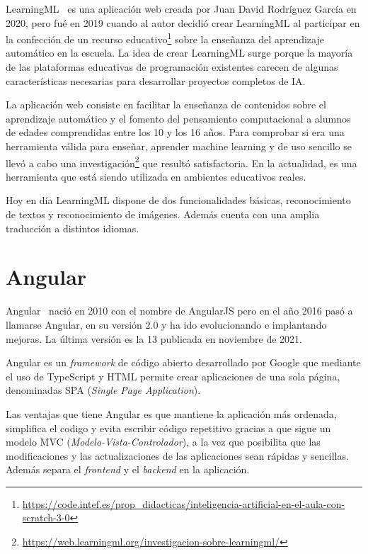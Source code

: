 \documentclass[a4paper, 12pt]{book}
\begin{document}
LearningML~\cite{Pagina_de_LearningML} es una aplicación web creada por Juan David Rodríguez García en 2020, pero fué en 2019 cuando al autor decidió crear LearningML al participar en la confección de un recurso educativo\footnote{\url{https://code.intef.es/prop_didacticas/inteligencia-artificial-en-el-aula-con-scratch-3-0}}  sobre la enseñanza del aprendizaje automático en la escuela. La idea de crear LearningML surge porque la mayoría de las plataformas educativas de programación existentes carecen de algunas características necesarias para desarrollar proyectos completos de IA.

La aplicación web consiste en facilitar la enseñanza de contenidos sobre el aprendizaje automático y el fomento del pensamiento computacional a alumnos de edades comprendidas entre los 10 y los 16 años. Para comprobar si era una 
herramienta válida para enseñar, aprender machine learning y de uso sencillo se llevó a cabo una investigación\footnote{\url{https://web.learningml.org/investigacion-sobre-learningml/}} que resultó satisfactoria. En la actualidad, es una herramienta que está siendo utilizada en ambientes educativos reales.

Hoy en día LearningML dispone de dos funcionalidades básicas, reconocimiento de textos y reconocimiento de imágenes. Además cuenta con una amplia traducción a distintos idiomas.

\section{Angular} 
\label{sec:Angular}

Angular~\cite{Pagina_de_angular, Curso_de_angular} nació en 2010 con el nombre de AngularJS pero en el año 2016 pasó a llamarse Angular, en su versión 2.0 y ha ido evolucionando e implantando mejoras. La última versión es la 13 publicada en noviembre de 2021.

Angular es un \emph{framework} de código abierto desarrollado por Google que mediante el uso de TypeScript y HTML permite crear aplicaciones de una sola página, denominadas SPA (\emph{Single Page Application}).

Las ventajas que tiene Angular es que mantiene la aplicación más ordenada, simplifica el codigo y evita escribir código repetitivo gracias a que sigue un modelo MVC (\emph{Modelo-Vista-Controlador}), a la vez que posibilita que las modificaciones y las actualizaciones de las aplicaciones sean rápidas y sencillas. Además separa el \emph{frontend} y el \emph{backend} en la aplicación.
\end{document}
